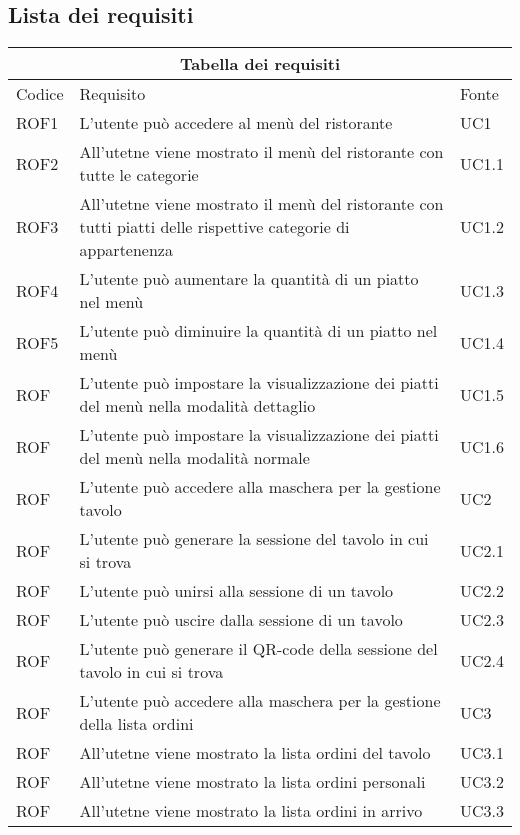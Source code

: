 \subsection{Lista dei requisiti}
\begin{center}
    \renewcommand{\arraystretch}{2}
    \begin{longtable}{ |p{1.5cm}|p{9cm}|p{1.5cm}|  }
        \hline
        \multicolumn{3}{|c|}{Tabella dei requisiti} \\
        \hline
        Codice&Requisito &Fonte \\
        \hline
        ROF1&L'utente può accedere al menù del ristorante&UC1 \\
        ROF2&All'utetne viene mostrato il menù del ristorante con tutte le categorie&UC1.1 \\
        ROF3&All'utetne viene mostrato il menù del ristorante con tutti piatti delle rispettive categorie di appartenenza&UC1.2 \\
        ROF4&L'utente può aumentare la quantità di un piatto nel menù&UC1.3 \\
        ROF5&L'utente può diminuire la quantità di un piatto nel menù&UC1.4 \\
        ROF&L'utente può impostare la visualizzazione dei piatti del menù nella modalità dettaglio&UC1.5 \\
        ROF&L'utente può impostare la visualizzazione dei piatti del menù nella modalità normale&UC1.6 \\
        ROF&L'utente può accedere alla maschera per la gestione tavolo &UC2 \\
        ROF&L'utente può generare la sessione del tavolo in cui si trova&UC2.1\\
        ROF&L'utente può unirsi alla sessione di un tavolo&UC2.2 \\
        ROF&L'utente può uscire dalla sessione di un tavolo&UC2.3\\
        ROF&L'utente può generare il QR-code della sessione del tavolo in cui si trova&UC2.4\\
        ROF&L'utente può accedere alla maschera per la gestione della lista ordini&UC3 \\
        ROF&All'utetne viene mostrato la lista ordini del tavolo&UC3.1 \\
        ROF&All'utetne viene mostrato la lista ordini personali &UC3.2 \\
        ROF&All'utetne viene mostrato la lista ordini in arrivo&UC3.3 \\

\end{longtable}
\end{center}
